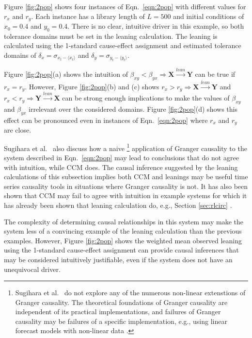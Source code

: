 \documentclass[twocolumn,aps,pre,groupedaddress]{revtex4-1}
\begin{document}
Figure \ref{fig:2pop} shows four instances of Eqn.\ \ref{eqn:2pop} with different values for $r_x$ and $r_y$.  Each instance has a library length of $L=500$ and initial conditions of $x_0 = 0.4$ and $y_0 = 0.4$.  There is no clear, intuitive driver in this example, so both tolerance domains must be set in the leaning calculation.  The leaning is calculated using the 1-standard cause-effect assignment and estimated tolerance domains of $\delta_x = \sigma_{x_t-\langle x_t \rangle}$ and $\delta_y = \sigma_{y_t-\langle y_t \rangle}$.

Figure \ref{fig:2pop}(a) shows the intuition of $\beta_{xy}<\beta_{yx}\Rightarrow\mathbf{X}\xrightarrow{lean}\mathbf{Y}$ can be true if $r_x=r_y$.  However, Figure \ref{fig:2pop}(b) and (c) shows $r_x>r_y\Rightarrow\mathbf{X}\xrightarrow{lean}\mathbf{Y}$ and $r_x<r_y\Rightarrow\mathbf{Y}\xrightarrow{lean}\mathbf{X}$ can be strong enough implications to make the values of $\beta_{xy}$ and $\beta_{yx}$ irrelevant over the considered domains.  Figure \ref{fig:2pop}(d) shows this effect can be pronounced even in instances of Eqn.\ \ref{eqn:2pop} where $r_x$ and $r_y$ are close.  

Sugihara et al.\ \cite{Sugihara2012} also discuss how a naive \footnote{Sugihara et al.\ \cite{Sugihara2012} do not explore any of the numerous non-linear extenstions of Granger causality.  The theoretical foundations of Granger causality are independent of its practical implementations, and failures of Granger causality may be failures of a specific implementation, e.g., using linear forecast models with non-linear data \cite{Granger1980}.} application of Granger causality to the system described in Eqn.\ \ref{eqn:2pop} may lead to conclusions that do not agree with intuition, while CCM does.  The causal inference suggested by the leaning calculations of this subsection implies both CCM and leanings may be useful time series causality tools in situations where Granger causality is not.  It has also been shown that CCM may fail to agree with intuition in example systems for which it has already been shown that leaning calculation do, e.g., Section \ref{sec:rlcirc} \cite{Weigel2014}.

The complexity of determining causal relationships in this system may make the system less of a convincing example of the leaning calculation than the previous examples.  However, Figure \ref{fig:2pop} shows the weighted mean observed leaning using the 1-standard cause-effect assignment can provide causal inferences that may be considered intuitively justifiable, even if the system does not have an unequivocal driver. 
\end{document}
